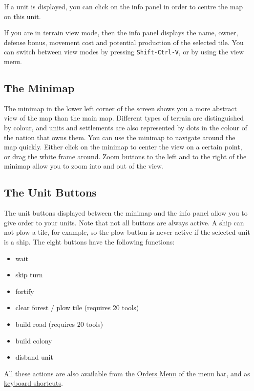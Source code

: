 \documentclass[12pt]{book}
\begin{document}
If a unit is displayed, you can click on the info panel in order to
centre the map on this unit.

If you are in terrain view mode, then the info panel displays the
name, owner, defense bonus, movement cost and potential production of
the selected tile. You can switch between view modes by pressing
\verb$Shift-Ctrl-V$, or by using the view menu.


\hypertarget{minimap}{\subsection{The Minimap}}

The minimap in the lower left corner of the screen shows you a more
abstract view of the map than the main map. Different types of terrain
are distinguished by colour, and units and settlements are also
represented by dots in the colour of the nation that owns them. You
can use the minimap to navigate around the map quickly. Either click
on the minimap to center the view on a certain point, or drag the
white frame around. Zoom buttons to the left and to the right of the
minimap allow you to zoom into and out of the view.


\hypertarget{unit buttons}{\subsection{The Unit Buttons}}

The unit buttons displayed between the minimap and the info panel
allow you to give order to your units. Note that not all buttons are
always active. A ship can not plow a tile, for example, so the plow
button is never active if the selected unit is a ship. The eight
buttons have the following functions:

\begin{itemize}
\item wait
\item skip turn
\item fortify
\item clear forest / plow tile (requires 20 tools)
\item build road (requires 20 tools)
\item build colony
\item disband unit
\end{itemize}

All these actions are also available from the \hyperlink{orders
menu}{Orders Menu} of the menu bar, and as \hyperlink{keyboard
shortcuts}{keyboard shortcuts}.
\end{document}
